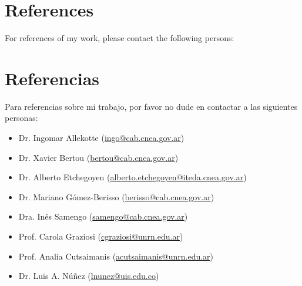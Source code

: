 \ifeng
\section*{References}

For references of my work, please contact the following persons:\\
\else
\section*{Referencias}

Para referencias sobre mi trabajo, por favor no dude en contactar a las siguientes personas:\\
\fi
\begin{itemize}
    \item Dr. Ingomar Allekotte (\href{mailto:ingo@cab.cnea.gov.ar}{ingo@cab.cnea.gov.ar})
    \item Dr. Xavier Bertou (\href{mailto:bertou@cab.cnea.gov.ar}{bertou@cab.cnea.gov.ar})
    \item Dr. Alberto Etchegoyen (\href{mailto:alberto.etchegoyen@iteda.cnea.gov.ar}{alberto.etchegoyen@iteda.cnea.gov.ar})
    \item Dr. Mariano Gómez-Berisso (\href{mailto:berisso@cab.cnea.gov.ar}{berisso@cab.cnea.gov.ar})
    \item Dra. Inés Samengo (\href{mailto:samengo@cab.cnea.gov.ar}{samengo@cab.cnea.gov.ar})
    \item Prof. Carola Graziosi (\href{mailto:cgraziosi@unrn.edu.ar}{cgraziosi@unrn.edu.ar})
    \item Prof. Analía Cutsaimanis (\href{mailto:acutsaimanis@unrn.edu.ar}{acutsaimanis@unrn.edu.ar})
    \item Dr. Luis A. Núñez (\href{mailto:lnunez@uis.edu.co}{lnunez@uis.edu.co})
\end{itemize}
